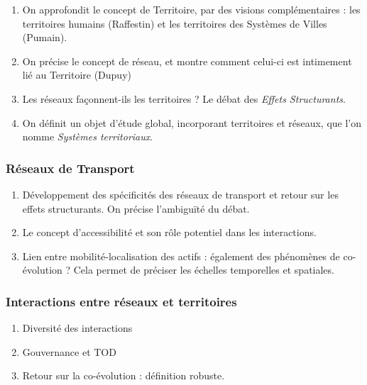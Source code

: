 \begin{enumerate}
	\item On approfondit le concept de Territoire, par des visions complémentaires : les territoires humains (Raffestin) et les territoires des Systèmes de Villes (Pumain).
	\item On précise le concept de réseau, et montre comment celui-ci est intimement lié au Territoire (Dupuy)
	\item Les réseaux façonnent-ils les territoires ? Le débat des \emph{Effets Structurants}.
	\item On définit un objet d'étude global, incorporant territoires et réseaux, que l'on nomme \emph{Systèmes territoriaux}.
\end{enumerate}

\subsubsection{Réseaux de Transport}



\begin{enumerate}
	\item Développement des spécificités des réseaux de transport et retour sur les effets structurants. On précise l'ambiguïté du débat.
	\item Le concept d'accessibilité et son rôle potentiel dans les interactions.
	\item Lien entre mobilité-localisation des actifs : également des phénomènes de co-évolution ? Cela permet de préciser les échelles temporelles et spatiales.
\end{enumerate}


\subsubsection{Interactions entre réseaux et territoires}


\begin{enumerate}
	\item Diversité des interactions
	\item Gouvernance et TOD
	\item Retour sur la co-évolution : définition robuste.
\end{enumerate}



